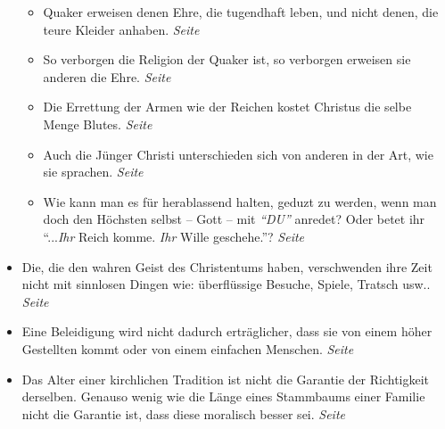 \begin{itemize}
\begin{itemize}
 \item Quaker erweisen denen Ehre, die tugendhaft leben, und nicht denen, die
teure Kleider anhaben.
 \dotfill \textit{Seite~\pageref{ref:09_36_ehre_erweisen}}\\

 \item So verborgen die Religion der Quaker ist, so verborgen erweisen sie
anderen die Ehre.
 \dotfill \textit{Seite~\pageref{ref:09_37_ehre_erweisen}}\\

 \item Die Errettung der Armen wie der Reichen kostet Christus die selbe Menge
Blutes.
 \dotfill \textit{Seite~\pageref{ref:09_39_erettung}}\\

 \item Auch die Jünger Christi unterschieden sich von anderen in der Art, wie sie
sprachen.
 \dotfill \textit{Seite~\pageref{ref:10_08_sprache}}\\

 \item Wie kann man es für herablassend halten, geduzt zu werden, wenn man doch
den Höchsten selbst -- Gott -- mit \textit{"`DU"'} anredet? Oder betet ihr
"`...\textit{Ihr} Reich komme. \textit{Ihr} Wille geschehe."'?
 \dotfill \textit{Seite~\pageref{ref:10_08_duzen}}\\

 \end{itemize}

 \item Die, die den wahren Geist des Christentums haben, verschwenden ihre Zeit
nicht mit sinnlosen Dingen wie: überflüssige Besuche, Spiele, Tratsch usw..
 \dotfill \textit{Seite~\pageref{ref:10_08_zeitvertreib}}\\

 \item Eine Beleidigung wird nicht dadurch erträglicher, dass sie von einem
höher Gestellten kommt oder von einem einfachen Menschen.
 \dotfill \textit{Seite~\pageref{ref:11_03_beleidigung}}\\

 \item Das Alter einer kirchlichen Tradition ist nicht die Garantie der
Richtigkeit derselben. Genauso wenig wie die Länge eines Stammbaums einer
Familie nicht die Garantie ist, dass diese moralisch besser sei.
 \dotfill \textit{Seite~\pageref{ref:11_04_abstammung}}\\


\end{itemize}
